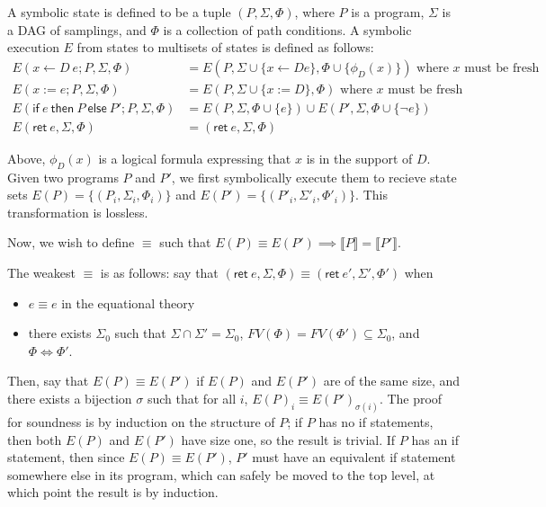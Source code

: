 \documentclass{article}
\newcommand{\eif}{\textsf{if}\ }
\newcommand{\ethen}{\textsf{then}\ }
\newcommand{\eelse}{\textsf{else}\ }
\newcommand{\eret}{\textsf{ret}\ }
\begin{document}
    A symbolic state is defined to be a tuple $(P, \Sigma, \Phi)$, where $P$ is a program, $\Sigma$ is a DAG of samplings, and $\Phi$ is a collection of path conditions. A symbolic execution $E$ from states to multisets of states is defined as follows:
    \begin{align*}
        E(x \leftarrow D\ e; P, \Sigma, \Phi) &= E(P, \Sigma \cup \{x \leftarrow D e\}, \Phi \cup \{\phi_D(x)\}) \text{ where $x$ must be fresh } \\
        E(x := e; P, \Sigma, \Phi) &= E(P, \Sigma \cup \{x := D\}, \Phi) \text{ where $x$ must be fresh} \\
        E(\eif e\ \ethen P\ \eelse P'; P, \Sigma, \Phi) &= E(P, \Sigma, \Phi \cup \{e\}) \cup E(P', \Sigma, \Phi \cup \{\neg e\}) \\
        E(\eret e, \Sigma, \Phi) &= (\eret e, \Sigma, \Phi)
    \end{align*}


        
    Above, $\phi_D(x)$ is a logical formula expressing that $x$ is in the support of $D$. Given two programs $P$ and $P'$, we first symbolically execute them to recieve state sets $E(P) = \{(P_i, \Sigma_i, \Phi_i)\}$ and $E(P') = \{(P'_i, \Sigma'_i, \Phi'_i)\}$. This transformation is lossless.

    Now, we wish to define $\equiv$ such that $E(P) \equiv E(P') \implies \llbracket P \rrbracket = \llbracket P' \rrbracket$.

    The weakest $\equiv$ is as follows: say that $(\eret e, \Sigma, \Phi) \equiv (\eret e', \Sigma', \Phi')$ when
    \begin{itemize}
        \item $e \equiv e$ in the equational theory
        \item there exists $\Sigma_0$ such that $\Sigma \cap \Sigma' = \Sigma_0$, $FV(\Phi) = FV(\Phi') \subseteq \Sigma_0$, and $\Phi \iff \Phi'$.
    \end{itemize}

    Then, say that $E(P) \equiv E(P')$ if $E(P)$ and $E(P')$ are of the same size, and there exists a bijection $\sigma$ such that for all $i$, $E(P)_i \equiv E(P')_{\sigma(i)}$. The proof for soundness is by induction on the structure of $P$; if $P$ has no if statements, then both $E(P)$ and $E(P')$ have size one, so the result is trivial. If $P$ has an if statement, then since $E(P) \equiv E(P')$, $P'$ must have an equivalent if statement somewhere else in its program, which can safely be moved to the top level, at which point the result is by induction.
    
\end{document}
